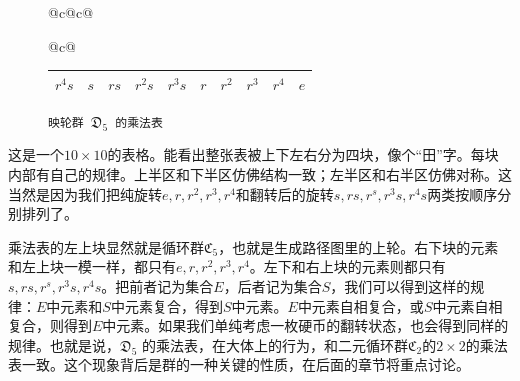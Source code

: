 \documentclass[12pt,UTF8,fontset=none]{ctexbook}
\begin{document}
\begin{figure}[!htbp]
\begin{tabular}{@{}c@{\hspace{4pt}}c@{}}
\begin{tabular}{@{}c@{}}
\begin{tabular}{|*{10}{>{\centering\arraybackslash}p{\colwidth}|}}
                \cellcolor{c9}$r^4s$ & \cellcolor{c5}$s$ & \cellcolor{c6}$rs$ & \cellcolor{c7}$r^2s$ & \cellcolor{c8}$r^3s$ & \cellcolor{c1}$r$ & \cellcolor{c2}$r^2$ & \cellcolor{c3}$r^3$ & \cellcolor{c4}$r^4$ & \cellcolor{c0}$e$ \\ \hline
            \end{tabular}
        \end{tabular}

    \end{tabular}
    \caption{\texttt{映轮群 $\mathfrak{D}_5$ 的乘法表}}
\end{figure}

这是一个$10\times 10$的表格。能看出整张表被上下左右分为四块，像个“田”字。每块内部有自己的规律。上半区和下半区仿佛结构一致；左半区和右半区仿佛对称。这当然是因为我们把纯旋转$e,r,r^2,r^3,r^4$和翻转后的旋转$s,rs,r^s,r^3s,r^4s$两类按顺序分别排列了。

乘法表的左上块显然就是循环群$\mathfrak{C}_5$，也就是生成路径图里的上轮。右下块的元素和左上块一模一样，都只有$e,r,r^2,r^3,r^4$。左下和右上块的元素则都只有$s,rs,r^s,r^3s,r^4s$。把前者记为集合$E$，后者记为集合$S$，我们可以得到这样的规律：$E$中元素和$S$中元素复合，得到$S$中元素。$E$中元素自相复合，或$S$中元素自相复合，则得到$E$中元素。如果我们单纯考虑一枚硬币的翻转状态，也会得到同样的规律。也就是说，$\mathfrak{D}_5$ 的乘法表，在大体上的行为，和二元循环群$\mathfrak{C}_2$的$2\times 2$的乘法表一致。这个现象背后是群的一种关键的性质，在后面的章节将重点讨论。

\vspace{12pt}
\def\overlayopacity{0.65}   %
\def\crosslinewidth{2.5pt}  %
\def\labelpad{6pt}          %
\end{document}
